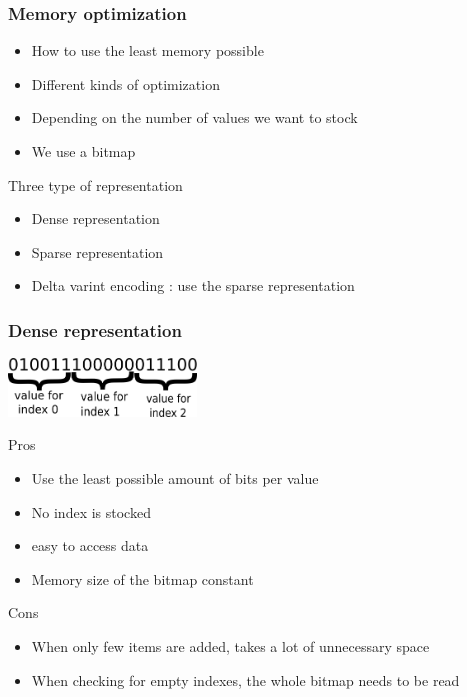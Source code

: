 \documentclass{beamer}
\begin{document}
\begin{frame}
\frametitle{Memory optimization}
	\begin{itemize}
		\item How to use the least memory possible
		\item Different kinds of optimization
		\item Depending on the number of values we want to stock
		\item We use a bitmap
	\end{itemize}
	\begin{block}{Three type of representation}
		\begin{itemize}
			\item Dense representation
			\item Sparse representation
			\item Delta varint encoding : use the sparse representation
		\end{itemize}
	\end{block}
\end{frame}

\begin{frame}
\frametitle{Dense representation}
	\begin{center}
		\includegraphics[width=5cm]{dense.png} \\
	\end{center}
	\begin{block}{Pros}
		\begin{itemize}
			\item Use the least possible amount of bits per value
			\item No index is stocked
			\item easy to access data
			\item Memory size of the bitmap constant
		\end{itemize}
	\end{block}
	
	\begin{block}{Cons}
		\begin{itemize}
			\item When only few items are added, takes a lot of unnecessary space
			\item When checking for empty indexes, the whole bitmap needs to be read
		\end{itemize}
	\end{block}
\end{frame}
\end{document}
